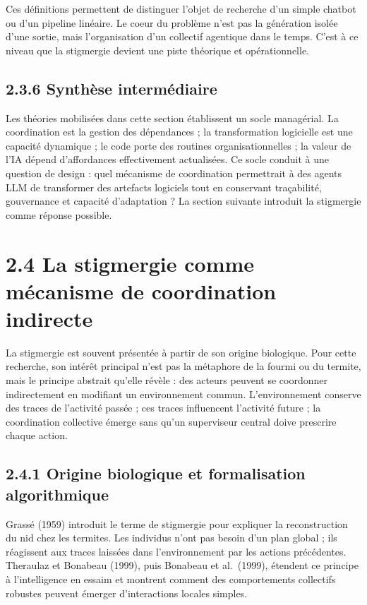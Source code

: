 Ces définitions permettent de distinguer l'objet de recherche d'un simple chatbot ou d'un pipeline linéaire. Le coeur du problème n'est pas la génération isolée d'une sortie, mais l'organisation d'un collectif agentique dans le temps. C'est à ce niveau que la stigmergie devient une piste théorique et opérationnelle.

\subsection{2.3.6 Synthèse intermédiaire}\label{synthuxe8se-intermuxe9diaire-1}

Les théories mobilisées dans cette section établissent un socle managérial. La coordination est la gestion des dépendances ; la transformation logicielle est une capacité dynamique ; le code porte des routines organisationnelles ; la valeur de l'IA dépend d'affordances effectivement actualisées. Ce socle conduit à une question de design : quel mécanisme de coordination permettrait à des agents LLM de transformer des artefacts logiciels tout en conservant traçabilité, gouvernance et capacité d'adaptation ? La section suivante introduit la stigmergie comme réponse possible.

\section{2.4 La stigmergie comme mécanisme de coordination indirecte}\label{la-stigmergie-comme-muxe9canisme-de-coordination-indirecte}

La stigmergie est souvent présentée à partir de son origine biologique. Pour cette recherche, son intérêt principal n'est pas la métaphore de la fourmi ou du termite, mais le principe abstrait qu'elle révèle : des acteurs peuvent se coordonner indirectement en modifiant un environnement commun. L'environnement conserve des traces de l'activité passée ; ces traces influencent l'activité future ; la coordination collective émerge sans qu'un superviseur central doive prescrire chaque action.

\subsection{2.4.1 Origine biologique et formalisation algorithmique}\label{origine-biologique-et-formalisation-algorithmique}

Grassé (1959) introduit le terme de stigmergie pour expliquer la reconstruction du nid chez les termites. Les individus n'ont pas besoin d'un plan global ; ils réagissent aux traces laissées dans l'environnement par les actions précédentes. Theraulaz et Bonabeau (1999), puis Bonabeau et al.~(1999), étendent ce principe à l'intelligence en essaim et montrent comment des comportements collectifs robustes peuvent émerger d'interactions locales simples.


